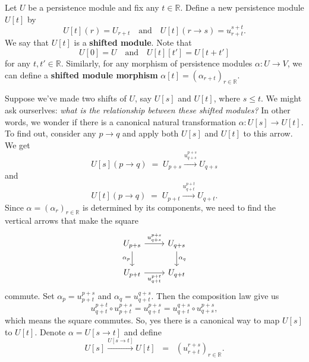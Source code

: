 \documentclass[11pt]{article}
\begin{document}
Let \(U\) be a persistence module and fix  any \(t\in \mathbb{R}\).
Define a new persistence module \(U[t]\) by 
\[
%
U[t](r)  = U_{r+t}
\quad\text{and}\quad 
U[t](r\to s) = u_{r+t}^{s+t}.
\]
We say that \(U[t]\) is a \textbf{shifted module}.
Note that  
$$
U[0]=U
\quad\text{and}\quad
U[t][t'] = U[t+t']
$$
for any \(t,t'\in \mathbb{R}\).
Similarly,
for any morphism of persistence modules \(\alpha\colon U\to V\),
we can define a \textbf{shifted module morphism} \(\alpha[t] = (\alpha_{r+t})_{r\in \mathbb{R}}\).

Suppose we've made two shifts of \(U\), say \(U[s]\) and \(U[t]\), where \(s\leq t\).
We might ask ourserlves: \textit{what is the relationship between these shifted modules?}
In other words, we wonder if there is a canonical natural transformation
\(\alpha\colon U[s]\to U[t]\).
To find out, consider any \(p\to q\) and apply both  \(U[s]\) and \(U[t]\) to this arrow.
We get 
$$
U[s](p\to q)\; =\; U_{p+s}\xrightarrow{u_{q+s}^{p+s}} U_{q+s}
$$
and 
$$
U[t](p\to q) \;=\; U_{p+t}\xrightarrow{u_{q+t}^{p+t}} U_{q+t}.
$$
Since \(\alpha=(\alpha_r )_{r\in \mathbb{R}}\) 
is determined by its components,
we need to find the vertical arrows 
that make the square
$$
\begin{tikzcd}
U_{p+s} \arrow[r, "u_{q+s}^{p+s}"] \arrow[d, "\alpha_p"'] & U_{q+s} \arrow[d, "\alpha_q"] \\
U_{p+t} \arrow[r, "u_{q+t}^{p+t}"']                       & U_{q+t}                      
\end{tikzcd}
$$
%
commute. 
Set \(\alpha_p = u_{p+t}^{p+s}\) and \(\alpha_{q}=u_{q+t}^{q+s}\).
Then the composition law give us 
\[
u_{q+t}^{p+t} \circ  u_{p+t}^{p+s} = u_{q+t}^{p+s} = u_{q+t}^{q+s}\circ u_{q+s}^{p+s},
\]
which means the square commutes.
So, yes there is a canonical way to map \(U[s]\) to \(U[t]\).
Denote \(\alpha = U[s\to t]\) and define  
$$
U[s]\xrightarrow{U[s\to t]} U[t]\;\; = \;\;\left( u_{r+t}^{r+s} \right)_{r\in \mathbb{R}}.
$$
\end{document}
